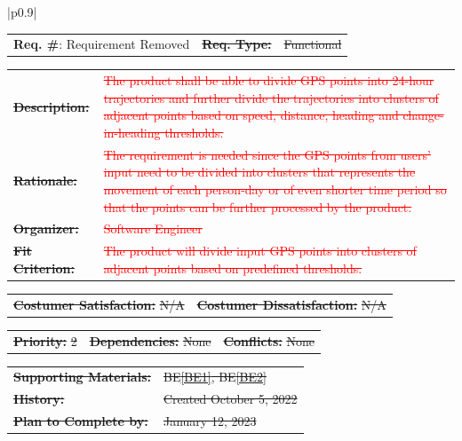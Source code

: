 \documentclass[12pt, titlepage]{article}
\newcommand{\beref}[1]{BE\ref{#1}}
\newcounter{reqnum}
\newcommand{\reqthereqnum}{\textbf{Req. \#}: \thereqnum}
\newenvironment{boxed}
    {\begin{center}
    \begin{tabular}{|p{0.9\textwidth}|}
    \hline\\
    }
    { 
    \\\\\hline
    \end{tabular} 
    \end{center}
    }
\begin{document}
\begin{boxed}
\begin{tabular}{l r r}
 \color{red} {reqnum} \reqthereqnum \label{Req3} Requirement Removed & \color{red}\sout{\textbf{Req. Type:}} &  \color{red}\sout{Functional}\\
\end{tabular}
\newline
\begin{tabular}{l p{11.5cm}}
    \color{red}\sout{\bf Description:} & \textcolor{red}{\sout{The product shall be able to divide GPS points into 24-hour trajectories and further divide the trajectories into clusters of adjacent points based on speed, distance, heading and change-in-heading thresholds.}}\\
    \color{red}\sout{\bf Rationale:} & \textcolor{red}{\sout{The requirement is needed since the GPS points from users' input need to be divided into clusters that represents the movement of each person-day or of even shorter time period so that the points can be further processed by the product.}}\\
    \color{red}\sout{\bf Organizer:} & \textcolor{red}{\sout{Software Engineer}}\\
    \color{red}\sout{\textbf{Fit Criterion:}} & \textcolor{red}{\sout{The product will divide input GPS points into clusters of adjacent points based on predefined thresholds.}}\\
\end{tabular}
\begin{tabular}{l r}
\color{red}\sout{\textbf{Costumer Satisfaction:}} \sout{N/A}  & \color{red}\sout{\textbf{Costumer Dissatisfaction:}} \sout{N/A}\\
\end{tabular}
\begin{tabular}{l r r}
    \color{red}\sout{\bf Priority:} \sout{2} & \color{red}\sout{\bf Dependencies:} \sout{None}  & \color{red}\sout{\bf Conflicts:} \sout{None} \\
\end{tabular}
\begin{tabular}{l l}
     \color{red}\sout{\bf{Supporting Materials:}}& \color{red}\sout{\beref{BE1}, \beref{BE2}}\\ 
     \color{red}\sout{\bf History:} & \color{red}\sout{Created October 5, 2022}\\
     \color{red}\sout{\textbf{Plan to Complete by:}} & \color{red}\sout{January 12, 2023}\\
\end{tabular}
\end{boxed}
\end{document}
